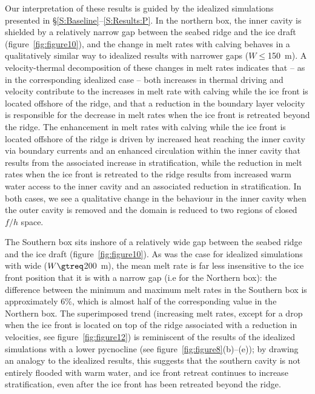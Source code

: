 \documentclass[draft]{agujournal2019}
\begin{document}
Our interpretation of these results is guided by the idealized simulations presented in \S\ref{S:Baseline}--\ref{S:Results:P}. In the northern box, the inner cavity is shielded by a relatively narrow gap between the seabed ridge and the ice draft (figure~\ref{fig:figure10}), and the change in melt rates with calving behaves in a qualitatively similar way to idealized results with narrower gaps ($W\leq$150~m). A velocity-thermal decomposition of these changes in melt rates indicates that -- as in the corresponding idealized case -- both increases in thermal driving and velocity contribute to the increases in melt rate with calving while the ice front is located offshore of the ridge, and that a reduction in the boundary layer velocity is responsible for the decrease in melt rates when the ice front is retreated beyond the ridge. The enhancement in melt rates with calving while the ice front is located offshore of the ridge is driven by increased heat reaching the inner cavity via boundary currents and an enhanced circulation within the inner cavity that results from the associated increase in stratification, while the reduction in melt rates when the ice front is retreated to the ridge results from increased warm water access to the inner cavity and an associated reduction in stratification. In both cases, we see a qualitative change in the behaviour in the inner cavity when the outer cavity is removed and the domain is reduced to two regions of closed $f/h$ space. 


The Southern box sits inshore of a relatively wide gap between the seabed ridge and the ice draft (figure~\ref{fig:figure10}). As was the case for idealized simulations with wide ($W \gtreq$200~m), the mean melt rate is far less insensitive to the ice front position that it is with a narrow gap (i.e for the Northern box): the difference between the minimum and maximum melt rates in the Southern box is approximately 6\%, which is almost half of the corresponding value in the Northern box. The superimposed trend (increasing melt rates, except for a drop when the ice front is located on top of the ridge associated with a reduction in velocities, see figure~\ref{fig:figure12}) is reminiscent of the results of the idealized simulations with a lower pycnocline (see figure~\ref{fig:figure8}(b)--(e)); by drawing an analogy to the idealized results, this suggests that the southern cavity is not entirely flooded with warm water, and ice front retreat continues to increase stratification, even after the ice front has been retreated beyond the ridge.
\end{document}
